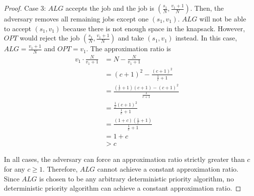 \documentclass[11pt]{article}
\begin{document}
\begin{enumerate}[leftmargin=16pt]
\begin{enumerate}[leftmargin=16pt]
\begin{proof}
            Case 3: $ALG$ accepts the job and the job is $(\frac{s_1}{N},\frac{v_1+1}{N})$. Then, the adversary removes all remaining jobs except one $(s_1,v_1)$. $ALG$ will not be able to accept $(s_1,v_1)$ because there is not enough space in the knapsack. However, $OPT$ would reject the job $(\frac{s_1}{N},\frac{v_1+1}{N})$ and take $(s_1,v_1)$ instead. In this case, $ALG = \frac{v_1+1}{N}$ and $OPT = v_1$. The approximation ratio is 
            $$
            \begin{aligned}
                v_1 \cdot \frac{N}{v_1+1} &= N - \frac{N}{v_1 + 1} \\
                &= (c+1)^2 - \frac{(c+1)^2}{\frac{1}{c}+1} \\
                &= \frac{(\frac{1}{c}+1)(c+1) - (c+1)^2}{\frac{1}{c+1}} \\
                &= \frac{\frac{1}{c}(c+1)^2}{\frac{1}{c}+1} \\
                &= \frac{(1+c)(\frac{1}{c}+1)}{\frac{1}{c}+1} \\
                &= 1+c \\
                &> c
            \end{aligned}
            $$

            In all cases, the adversary can force an approximation ratio strictly greater than $c$ for any $c \geq 1$. Therefore, $ALG$ cannot achieve a constant approximation ratio. Since $ALG$ is chosen to be any arbitrary deterministic priority algorithm, no deterministic priority algorithm can achieve a constant approximation ratio.
        \end{proof}
    \end{enumerate}
\end{enumerate}
\end{document}
